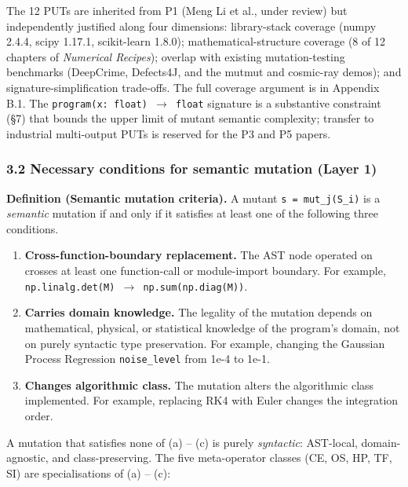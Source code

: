 \documentclass[review,12pt,authoryear]{elsarticle}
\newcounter{none}                   %
\begin{document}
The 12 PUTs are inherited from P1 (Meng Li et al., under review) but
independently justified along four dimensions: library-stack coverage
(numpy 2.4.4, scipy 1.17.1, scikit-learn 1.8.0); mathematical-structure
coverage (8 of 12 chapters of \emph{Numerical Recipes}); overlap with
existing mutation-testing benchmarks (DeepCrime, Defects4J, and the
mutmut and cosmic-ray demos); and signature-simplification trade-offs.
The full coverage argument is in Appendix B.1. The
\texttt{program(x:\ float)\ $\to$\ float} signature is a substantive
constraint (§7) that bounds the upper limit of mutant semantic
complexity; transfer to industrial multi-output PUTs is reserved for the
P3 and P5 papers.

\subsubsection{3.2 Necessary conditions for semantic mutation (Layer
1)}\label{necessary-conditions-for-semantic-mutation-layer-1}

\textbf{Definition (Semantic mutation criteria).} A mutant
\texttt{s\textquotesingle{}\ =\ mut\_j(S\_i)} is a \emph{semantic}
mutation if and only if it satisfies at least one of the following three
conditions.

\begin{enumerate}
\def\labelenumi{(\alph{enumi})}
\item
  \textbf{Cross-function-boundary replacement.} The AST node operated on
  crosses at least one function-call or module-import boundary. For
  example, \texttt{np.linalg.det(M)\ $\to$\ np.sum(np.diag(M))}.
\item
  \textbf{Carries domain knowledge.} The legality of the mutation
  depends on mathematical, physical, or statistical knowledge of the
  program's domain, not on purely syntactic type preservation. For
  example, changing the Gaussian Process Regression
  \texttt{noise\_level} from 1e-4 to 1e-1.
\item
  \textbf{Changes algorithmic class.} The mutation alters the
  algorithmic class implemented. For example, replacing RK4 with Euler
  changes the integration order.
\end{enumerate}

A mutation that satisfies none of (a) -- (c) is purely \emph{syntactic}:
AST-local, domain-agnostic, and class-preserving. The five meta-operator
classes (CE, OS, HP, TF, SI) are specialisations of (a) -- (c):
\end{document}
